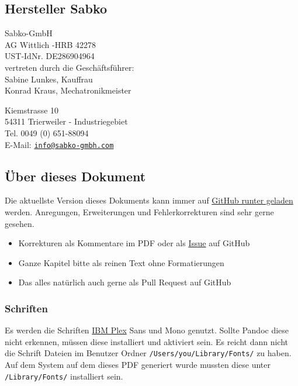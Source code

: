\documentclass[]{article}
\providecommand{\tightlist}{%
  \setlength{\itemsep}{0pt}\setlength{\parskip}{0pt}}
\begin{document}
\hypertarget{hersteller-sabko}{%
\subsection{Hersteller Sabko}\label{hersteller-sabko}}

Sabko-GmbH\\
AG Wittlich -HRB 42278\\
UST-IdNr. DE286904964\\
vertreten durch die Geschäftsführer:\\
Sabine Lunkes, Kauffrau\\
Konrad Kraus, Mechatronikmeister

Kiemstrasse 10\\
54311 Trierweiler - Industriegebiet\\
Tel. 0049 (0) 651-88094\\
E-Mail:
\href{mailto:info@sabko-gmbh.com}{\nolinkurl{info@sabko-gmbh.com}}

\hypertarget{uxfcber-dieses-dokument}{%
\subsection{Über dieses Dokument}\label{uxfcber-dieses-dokument}}

Die aktuellste Version dieses Dokuments kann immer auf
\href{https://github.com/FH-Potsdam/the-ultimate-laser-guide/raw/master/The-Ultimate-Laser-Guide.pdf}{GitHub
runter geladen} werden. Anregungen, Erweiterungen und Fehlerkorrekturen
sind sehr gerne gesehen.

\begin{itemize}
\tightlist
\item
  Korrekturen als Kommentare im PDF oder als
  \href{https://github.com/FH-Potsdam/the-ultimate-laser-guide/issues}{Issue}
  auf GitHub
\item
  Ganze Kapitel bitte als reinen Text ohne Formatierungen
\item
  Das alles natürlich auch gerne als Pull Request auf GitHub
\end{itemize}

\hypertarget{schriften}{%
\subsubsection{Schriften}\label{schriften}}

Es werden die Schriften \href{https://github.com/IBM/plex}{IBM Plex}
Sans und Mono genutzt. Sollte Pandoc diese nicht erkennen, müssen diese
installiert und aktiviert sein. Es reicht dann nicht die Schrift Dateien
im Benutzer Ordner \texttt{/Users/you/Library/Fonts/} zu haben. Auf dem
System auf dem dieses PDF generiert wurde mussten diese unter
\texttt{/Library/Fonts/} installiert sein.
\end{document}
